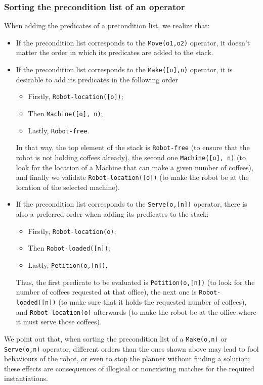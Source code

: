 \documentclass[12pt,a4paper,oneside]{article}
\numberwithin{equation}{section}
\numberwithin{equation}{section}
\theoremstyle{definition}
\begin{document}
\subsubsection{Sorting the precondition list of an operator}

When adding the predicates of a precondition list, we realize that:
\begin{itemize}
	\item If the precondition list corresponds to the \texttt{Move(o1,o2)} operator, it doesn’t matter the order in which its predicates are added to the stack. 
	\item If the precondition list corresponds to the \texttt{Make([o],n)} operator, it is desirable to add its predicates in the following order
	\begin{itemize}
		\item Firstly, \texttt{Robot-location([o])};
		\item Then \texttt{Machine([o], n)};
		\item Lastly, \texttt{Robot-free}.
	\end{itemize}
	In that way, the top element of the stack is \texttt{Robot-free} (to ensure that the robot is not holding coffees already), the second one \texttt{Machine([o], n)} (to look for the location of a Machine that can make a given number of coffees), and finally we validate \texttt{Robot-location([o])} (to make the robot be at the location of the selected machine). 
	\item If the precondition list corresponds to the \texttt{Serve(o,[n])} operator, there is also a preferred order when adding its predicates to the stack:
	\begin{itemize}
		\item Firstly, \texttt{Robot-location(o)};
		\item Then \texttt{Robot-loaded([n])};
		\item Lastly, \texttt{Petition(o,[n])}.
	\end{itemize}
	Thus, the first predicate to be evaluated is \texttt{Petition(o,[n])} (to look for the number of coffees requested at that office), the next one is \texttt{Robot-loaded([n])} (to make sure that it holds the requested number of coffees), and \texttt{Robot-location(o)} afterwards (to make the robot be at the office where it must serve those coffees). 
\end{itemize}

We point out that, when sorting the precondition list of a \texttt{Make(o,n)} or \texttt{Serve(o,n)} operator, different orders than the ones shown above may lead to fool behaviours of the robot, or even to stop the planner without finding a solution; these effects are consequences of illogical or nonexisting matches for the required instantiations. 
\end{document}
